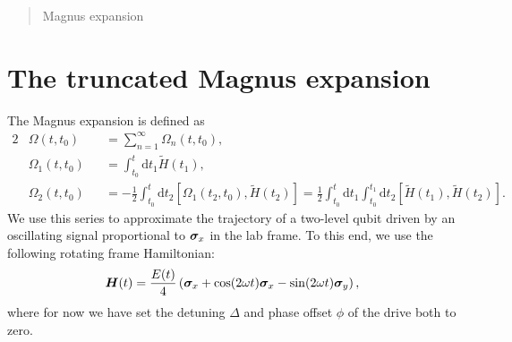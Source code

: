 \maketitle %
\thispagestyle{firststyle} %


\vspace{1em}
\begin{abstract}
\noindent  
Magnus expansion
	
\end{abstract}
\newpage

\tableofcontents





\newpage
\section{The truncated Magnus expansion}
The Magnus expansion\supercite{Magnusexponentialsolutiondifferential1954,WaughAverageHamiltonianTheory2007,BlanesMagnusexpansionits2009,BlanespedagogicalapproachMagnus2010} is defined as
\begin{alignat}{2}
	&\Omega(t,t_0) &&= \sum_{n=1}^\infty \Omega_n(t,t_0),\\
	&\Omega_1(t,t_0) &&= \int_{t_0}^t \mathrm{d}t_1 \tilde{H}(t_1),\label{eq:omg-1}\\
	&\Omega_2(t,t_0) &&= -\frac{1}{2}\int_{t_0}^t \mathrm{d}t_2 \left[ \Omega_1(t_2,t_0), \tilde{H}(t_2) \right] = \frac{1}{2}\int_{t_0}^t \mathrm{d}t_1 \int_{t_0}^{t_1} \mathrm{d}t_2 \left[ \tilde{H}(t_1), \tilde{H}(t_2) \right].
\end{alignat}
We use this series to approximate the trajectory of a two-level qubit driven by an oscillating signal proportional to $\bm{\sigma}_x$ in the lab frame. To this end, we use the following rotating frame Hamiltonian:
\begin{align}
	\label{eq:H-drive}
	\bm{H}(t) = \frac{E(t)}{4}\left( \bm{\sigma}_x + \cos(2 \omega t) \bm{\sigma}_x - \sin(2 \omega t) \bm{\sigma}_y \right),
\end{align}
where for now we have set the detuning $\Delta$ and phase offset $\phi$ of the drive both to zero.

